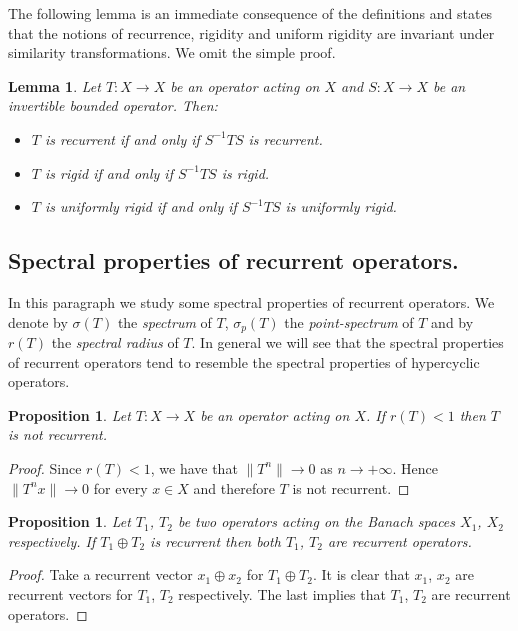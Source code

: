 \documentclass[12pt,leqno]{amsart}
\theoremstyle{plain}
\newtheorem{lemma}[equation]{Lemma}
\newtheorem{proposition}[equation]{Proposition}
\theoremstyle{definition}
\numberwithin{equation}{section}
\begin{document}
The following lemma is an immediate consequence of the definitions and states that the notions of recurrence, rigidity and uniform rigidity are invariant under similarity transformations. We omit the simple proof.

\begin{lemma}
	\label{l.equiv} Let $T:X\to X$ be an operator acting on $X$ and $S:X\to X$ be an invertible bounded operator. Then: 
	\begin{itemize}
		\item[(i)] $T$ is recurrent if and only if $S^{-1} T S$ is recurrent. 
		\item[(ii)] $T$ is rigid if and only if $S^{-1} T S$ is rigid. 
		\item[(iii)] $T$ is uniformly rigid if and only if $S^{-1} T S$ is uniformly rigid. 
	\end{itemize}
\end{lemma}

\subsection{Spectral properties of recurrent operators.} In this paragraph we study some spectral properties of recurrent operators. We denote by $\sigma(T)$ the \emph{spectrum} of $T$, $\sigma_p(T)$ the \emph{point-spectrum} of $T$ and by $r(T)$ the \emph{spectral radius} of $T$. In general we will see that the spectral properties of recurrent operators tend to resemble the spectral properties of hypercyclic operators.

\begin{proposition}
	\label{p.spectralradius} Let $T:X\rightarrow X$ be an operator acting on $X$. If $r(T)<1$ then $T$ is not recurrent. 
\end{proposition}

\begin{proof}
	Since $r(T)<1$, we have that $\| T^n\| \to 0$ as $n\to +\infty$. Hence $\| T^n x\| \to 0$ for every $x\in X$ and therefore $T$ is not recurrent. 
\end{proof}

\begin{proposition}
	\label{p.decomp} Let $T_1$, $T_2$ be two operators acting on the Banach spaces $X_1$, $X_2$ respectively. If $T_1\oplus T_2$ is recurrent then both $T_1$, $T_2$ are recurrent operators. 
\end{proposition}

\begin{proof}
	Take a recurrent vector $x_1\oplus x_2$ for $T_1\oplus T_2$. It is clear that $x_1$, $x_2$ are recurrent vectors for $T_1$, $T_2$ respectively. The last implies that $T_1$, $T_2$ are recurrent operators. 
\end{proof}
\end{document}
